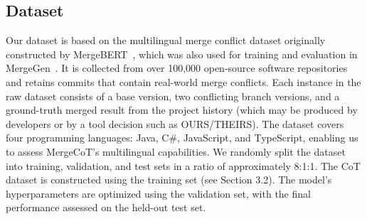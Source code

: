 \documentclass[sigconf,review,anonymous]{acmart}
\newcommand{\stma}[1]{\todo[inline]{\textcolor{black}{#1}}}
\begin{document}
\subsection{Dataset}

Our dataset is based on the multilingual merge conflict dataset originally constructed by MergeBERT~\cite{mergebert}, which was also used for training and evaluation in MergeGen~\cite{mergegen}. 
It is collected from over 100,000 open-source software repositories and retains commits that contain real-world merge conflicts.
Each instance in the raw dataset consists of a base version, two conflicting branch versions, and a ground-truth merged result from the project history (which may be produced by developers or by a tool decision such as OURS/THEIRS). The dataset covers four programming languages: Java, C\#, JavaScript, and TypeScript, enabling us to assess MergeCoT’s multilingual capabilities. We randomly split the dataset into training, validation, and test sets in a ratio of approximately 8:1:1. The CoT dataset is constructed using the training set (see Section 3.2). The model’s hyperparameters are optimized using the validation set, with the final performance assessed on the held-out test set.
\end{document}
